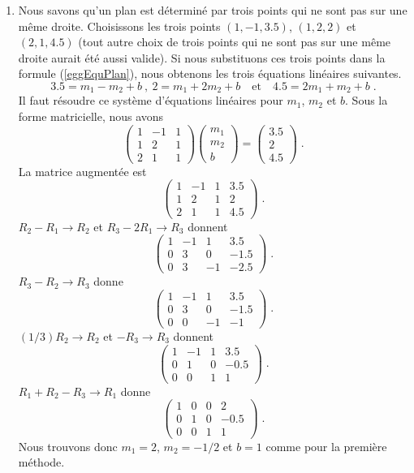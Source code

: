{\begin{egg}
\begin{enumerate}
La formule algébrique pour $f$ est $x_3=f(x_1,x_2) = 2x_1-0.5x_2 +1$.
\item Nous savons qu'un plan est déterminé par trois points qui ne
sont pas sur une même droite.  Choisissons les trois
points $(1,-1,3.5)$, $(1,2,2)$ et $(2,1,4.5)$ (tout
autre choix de trois points qui ne sont pas sur une même droite
aurait été aussi valide).
Si nous substituons ces trois points dans la formule
(\ref{eggEquPlan}), nous obtenons les trois équations linéaires
suivantes.
\[
3.5 = m_1- m_2 + b \ , \ 2 = m_1 + 2m_2 + b \quad \text{et} \quad
4.5 = 2 m_1 + m_2 + b \; .
\]
Il faut résoudre ce système d'équations linéaires pour $m_1$,
$m_2$ et $b$.  Sous la forme matricielle, nous avons
\[
\begin{pmatrix} 1 & -1 & 1 \\ 1 & 2 & 1 \\ 2 & 1 & 1 \end{pmatrix}
\begin{pmatrix} m_1 \\ m_2 \\ b \end{pmatrix}
= \begin{pmatrix} 3.5 \\ 2 \\ 4.5 \end{pmatrix} \; .
\]
La matrice augmentée est
\[
\left(\begin{array}{rrr|r}
1 & -1 & 1 & 3.5 \\
1 & 2 & 1 & 2 \\
2 & 1 & 1 & 4.5
\end{array}\right) \; .
\]
$R_2-R_1 \to R_2$ et $R_3 -2R_1 \to R_3$ donnent
\[
\left(\begin{array}{rrr|r}
1 & -1 & 1 & 3.5 \\
0 & 3 & 0 & -1.5 \\
0 & 3 & -1 & -2.5
\end{array}\right) \; .
\]
$R_3-R_2 \to R_3$ donne
\[
\left(\begin{array}{rrr|r}
1 & -1 & 1 & 3.5 \\
0 & 3 & 0 & -1.5 \\
0 & 0 & -1 & -1
\end{array}\right) \; .
\]
$(1/3)R_2 \to R_2$ et $-R_3\to R_3$ donnent
\[
\left(\begin{array}{rrr|r}
1 & -1 & 1 & 3.5 \\
0 & 1 & 0 & -0.5 \\
0 & 0 & 1 & 1
\end{array}\right) \; .
\]
$R_1+R_2 -R_3 \to R_1$ donne
\[
\left(\begin{array}{rrr|r}
1 & 0 & 0 & 2 \\
0 & 1 & 0 & -0.5 \\
0 & 0 & 1 & 1
\end{array}\right) \; .
\]
Nous trouvons donc $m_1=2$, $m_2 = -1/2$ et $b=1$ comme pour la première
méthode.
\end{enumerate}
\end{egg}

}

